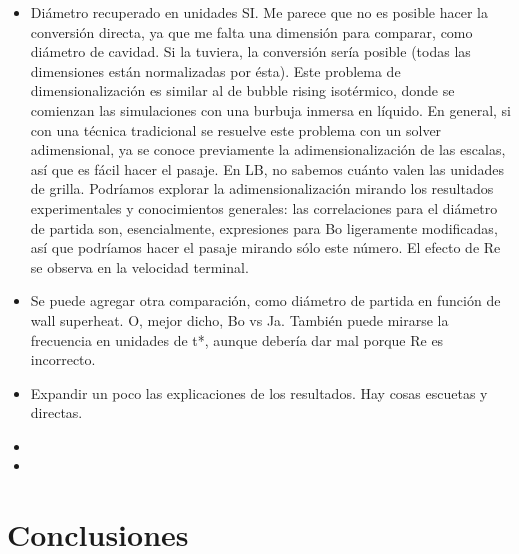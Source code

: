 \begin{itemize}
	\item Di\'ametro recuperado en unidades SI. Me parece que no es posible hacer la conversi\'on directa, ya que me falta una dimensi\'on para comparar, como di\'ametro de cavidad. Si la tuviera, la conversi\'on ser\'ia posible (todas las dimensiones est\'an normalizadas por \'esta). 
	Este problema de dimensionalizaci\'on es similar al de bubble rising isot\'ermico, donde se comienzan las simulaciones con una burbuja inmersa en l\'iquido. En general, si con una t\'ecnica tradicional se resuelve este problema con un solver adimensional, ya se conoce previamente la adimensionalizaci\'on de las escalas, as\'i que es f\'acil hacer el pasaje. En LB, no sabemos cu\'anto valen las unidades de grilla. Podr\'iamos explorar la adimensionalizaci\'on mirando los resultados experimentales y conocimientos generales: las correlaciones para el di\'ametro de partida son, esencialmente, expresiones para Bo ligeramente modificadas, as\'i que podr\'iamos hacer el pasaje mirando s\'olo este n\'umero. El efecto de Re se observa en la velocidad terminal.
	\item Se puede agregar otra comparaci\'on, como di\'ametro de partida en funci\'on de wall superheat. O, mejor dicho, Bo vs Ja. Tambi\'en puede mirarse la frecuencia en unidades de t*, aunque deber\'ia dar mal porque Re es incorrecto.
	\item Expandir un poco las explicaciones de los resultados. Hay cosas escuetas y directas.
	\item {}
	\item {}
\end{itemize}

\section{Conclusiones}